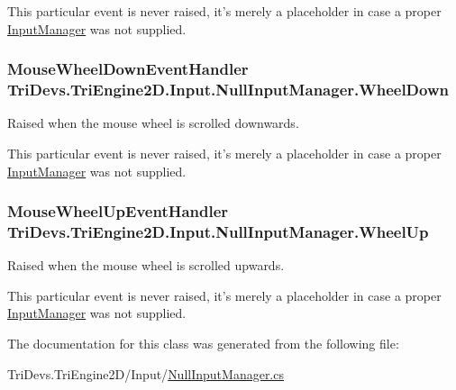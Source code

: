 This particular event is never raised, it's merely a placeholder in case a proper \hyperlink{class_tri_devs_1_1_tri_engine2_d_1_1_input_1_1_input_manager}{Input\-Manager} was not supplied. \hypertarget{class_tri_devs_1_1_tri_engine2_d_1_1_input_1_1_null_input_manager_afe91e27f9b43cc58ac374a35f8668986}{
\subsubsection[{Wheel\-Down}]{\setlength{\rightskip}{0pt plus 5cm}Mouse\-Wheel\-Down\-Event\-Handler Tri\-Devs.\-Tri\-Engine2\-D.\-Input.\-Null\-Input\-Manager.\-Wheel\-Down}}\label{class_tri_devs_1_1_tri_engine2_d_1_1_input_1_1_null_input_manager_afe91e27f9b43cc58ac374a35f8668986}


Raised when the mouse wheel is scrolled downwards. 

This particular event is never raised, it's merely a placeholder in case a proper \hyperlink{class_tri_devs_1_1_tri_engine2_d_1_1_input_1_1_input_manager}{Input\-Manager} was not supplied. \hypertarget{class_tri_devs_1_1_tri_engine2_d_1_1_input_1_1_null_input_manager_afba4f0aec6b09b046742c9015ee71a1b}{
\subsubsection[{Wheel\-Up}]{\setlength{\rightskip}{0pt plus 5cm}Mouse\-Wheel\-Up\-Event\-Handler Tri\-Devs.\-Tri\-Engine2\-D.\-Input.\-Null\-Input\-Manager.\-Wheel\-Up}}\label{class_tri_devs_1_1_tri_engine2_d_1_1_input_1_1_null_input_manager_afba4f0aec6b09b046742c9015ee71a1b}


Raised when the mouse wheel is scrolled upwards. 

This particular event is never raised, it's merely a placeholder in case a proper \hyperlink{class_tri_devs_1_1_tri_engine2_d_1_1_input_1_1_input_manager}{Input\-Manager} was not supplied. 

The documentation for this class was generated from the following file\-:\begin{DoxyCompactItemize}
\item 
Tri\-Devs.\-Tri\-Engine2\-D/\-Input/\hyperlink{_null_input_manager_8cs}{Null\-Input\-Manager.\-cs}\end{DoxyCompactItemize}
